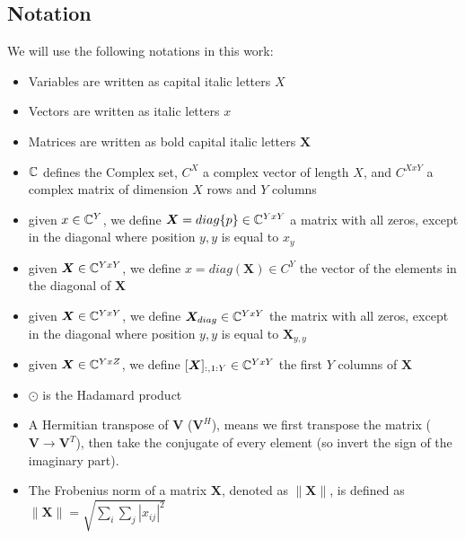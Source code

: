 \subsection{Notation}

We will use the following notations in this work:


\begin{itemize}
  \item Variables are written as capital italic letters $X$
  \item Vectors are written as italic letters $x$
  \item Matrices are written as bold capital italic letters $\bm{X}$
  \item $\mathbb{C}$ defines the Complex set, $C^X$ a complex vector of length $X$, and $C^{XxY}$ a complex matrix of dimension $X$ rows and $Y$ columns
  \item given $x \in \mathbb{C}^Y$, we define $\bm{X} = diag\{p\} \in \mathbb{C}^{YxY}$ a matrix with all zeros, except in the diagonal where position $y,y$ is equal to $x_y$
  \item given $\bm{X} \in \mathbb{C}^{YxY}$, we define $x = diag(\bm{X}) \in C^Y$ the vector of the elements in the diagonal of $\bm{X}$
  \item given $\bm{X} \in \mathbb{C}^{YxY}$, we define $\bm{X}_{diag} \in \mathbb{C}^{YxY}$ the matrix with all zeros, except in the diagonal where position $y,y$ is equal to $\bm{X}_{y,y}$
  \item given $\bm{X} \in \mathbb{C}^{YxZ}$, we define $[\bm{X}]_{:,1:Y} \in \mathbb{C}^{YxY}$ the first $Y$ columns of $\bm{X}$
  \item $\odot$ is the Hadamard product
  \item A Hermitian transpose of $\bm{V}$ ($\bm{V}^H$), means we first transpose the matrix ($\bm{V} \rightarrow \bm{V}^T$), then take the conjugate of every element (so invert the sign of the imaginary part).
  \item The Frobenius norm of a matrix $\bm{X}$, denoted as $\|\bm{X}\|$, is defined as $\|\bm{X}\| = \sqrt{\sum_{i}\sum_{j} |x_{ij}|^2}$
\end{itemize}

